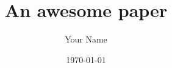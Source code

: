\documentclass[12pt]{article} %
\begin{document}

\title{An awesome paper} %
\author{Your Name}
\date{\today}
\maketitle %

\printbibliography{}
    
\end{document}
